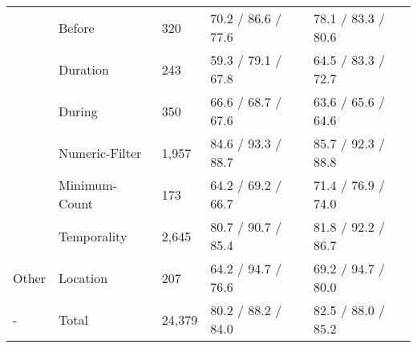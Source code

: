 \begin{tabular}{m{4.5cm} m{2.5cm} m{2cm} m{2.8cm} m{3cm}}
     &                       Before & 320 & 70.2 / 86.6 / 77.6 & 78.1 / 83.3 / 80.6 \\
     &                       Duration & 243 & 59.3 / 79.1 / 67.8 & 64.5 / 83.3 / 72.7 \\
     &                       During & 350 & 66.6 / 68.7 / 67.6 & 63.6 / 65.6 / 64.6 \\
     &                       Numeric-Filter & 1,957 & 84.6 / 93.3 / 88.7 & 85.7 / 92.3 / 88.8 \\
     &                       Minimum-Count & 173 & 64.2 / 69.2 / 66.7 & 71.4 / 76.9 / 74.0 \\
     &                       Temporality & 2,645 & 80.7 / 90.7 / 85.4 & 81.8 / 92.2 / 86.7 \\
    \hline
    Other &                  Location & 207 & 64.2 / 94.7 / 76.6 & 69.2 / 94.7 / 80.0 \\
    \hline
    - & Total & 24,379 & 80.2 / 88.2 / 84.0 & 82.5 / 88.0 / 85.2
\end{tabular}
